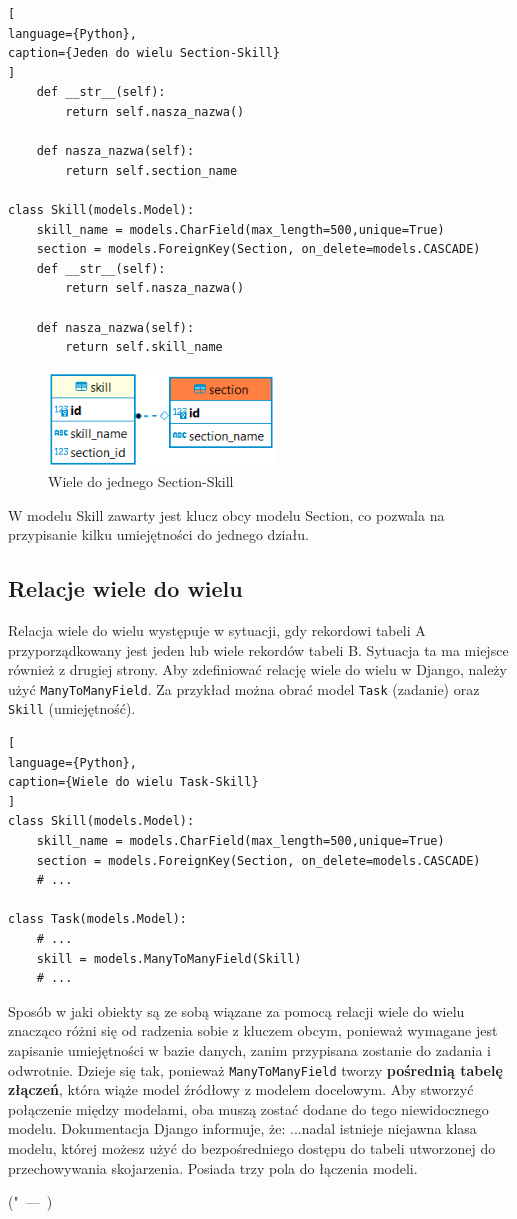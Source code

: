 \documentclass[oneside,polski,logo,indent]{amuthesis}
\let\oldquote\quote
\let\endoldquote\endquote
\renewenvironment{quote}[2][]
  {\if\relax\detokenize{#1}\relax
     \def\quoteauthor{#2}%
   \else
     \def\quoteauthor{#2~---~#1}%
   \fi
   \oldquote}
  {\par\nobreak\smallskip\hfill(\quoteauthor)%
   \endoldquote\addvspace{\bigskipamount}}
\begin{document}
\begin{enumerate}
\begin{enumerate}
\begin{lstlisting}[
language={Python},
caption={Jeden do wielu Section-Skill}
]
    def __str__(self):
        return self.nasza_nazwa()

    def nasza_nazwa(self):
        return self.section_name

class Skill(models.Model):
    skill_name = models.CharField(max_length=500,unique=True)
    section = models.ForeignKey(Section, on_delete=models.CASCADE)
    def __str__(self):
        return self.nasza_nazwa()

    def nasza_nazwa(self):
        return self.skill_name
\end{lstlisting}

\begin{figure}[H]
  \centering
  \includegraphics[width=6cm]{skillsec.png}
  \caption{Wiele do jednego Section-Skill}
  \label{obraz-przyklad}
\end{figure}

W modelu Skill zawarty jest klucz obcy modelu Section, co pozwala na przypisanie kilku umiejętności do jednego działu.
\subsection{Relacje wiele do wielu}
Relacja wiele do wielu występuje w sytuacji, gdy rekordowi tabeli A przyporządkowany jest jeden lub wiele rekordów tabeli B. Sytuacja ta ma miejsce również z drugiej strony.
Aby zdefiniować relację wiele do wielu w Django, należy użyć \texttt{ManyToManyField}. Za przykład można obrać model \texttt{Task} (zadanie) oraz \texttt{Skill} (umiejętność).
\begin{lstlisting}[
language={Python},
caption={Wiele do wielu Task-Skill}
]
class Skill(models.Model):
    skill_name = models.CharField(max_length=500,unique=True)
    section = models.ForeignKey(Section, on_delete=models.CASCADE)
	# ...

class Task(models.Model):
	# ...
    skill = models.ManyToManyField(Skill)
	# ...
\end{lstlisting}

Sposób w jaki obiekty są ze sobą wiązane za pomocą relacji wiele do wielu znacząco różni się od radzenia sobie z kluczem obcym, ponieważ wymagane jest zapisanie umiejętności w bazie danych, zanim przypisana zostanie do zadania i odwrotnie. Dzieje się tak, ponieważ \texttt{ManyToManyField} tworzy \textbf{pośrednią tabelę złączeń}, która wiąże model źródłowy z modelem docelowym. Aby stworzyć połączenie między modelami, oba muszą zostać dodane do tego niewidocznego modelu. Dokumentacja Django informuje, że:
\begin{quote}
"...nadal istnieje niejawna klasa modelu, której możesz użyć do bezpośredniego dostępu do tabeli utworzonej do przechowywania skojarzenia. Posiada trzy pola do łączenia modeli.


\end{quote}
\end{enumerate}
\end{enumerate}
\end{document}
